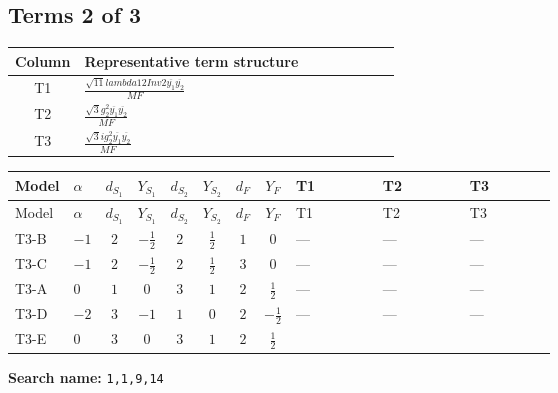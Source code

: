 \documentclass[8pt]{article}
\begin{document}
\begin{landscape}
\subsection*{Terms 2 of 3}
\begin{center}
\begin{tabular}{@{}c >{\raggedright\arraybackslash}p{0.82\linewidth}@{}}
\toprule
Column & Representative term structure \\
\midrule
T1 & \(\displaystyle \frac{\sqrt{11} lambda12Inv2 \overline{y_{1}} \overline{y_{2}}}{MF}\) \\
\midrule
T2 & \(\displaystyle \frac{\sqrt{3} g_{2}^{2} \overline{y_{1}} \overline{y_{2}}}{MF}\) \\
\midrule
T3 & \(\displaystyle \frac{\sqrt{3} i g_{2}^{2} \overline{y_{1}} \overline{y_{2}}}{MF}\) \\
\midrule
\bottomrule
\end{tabular}
\end{center}
\smallskip
\tiny
\begin{longtable}{@{}llcccccc >{\raggedright\arraybackslash}p{0.21\linewidth} >{\raggedright\arraybackslash}p{0.21\linewidth} >{\raggedright\arraybackslash}p{0.21\linewidth}@{}}
\toprule
Model & $\alpha$ & $d_{S_1}$ & $Y_{S_1}$ & $d_{S_2}$ & $Y_{S_2}$ & $d_F$ & $Y_F$ & T1 & T2 & T3 \\
\midrule
\endfirsthead
\toprule
Model & $\alpha$ & $d_{S_1}$ & $Y_{S_1}$ & $d_{S_2}$ & $Y_{S_2}$ & $d_F$ & $Y_F$ & T1 & T2 & T3 \\
\midrule
\endhead
T3-B & $-1$ & $2$ & $-\frac{1}{2}$ & $2$ & $\frac{1}{2}$ & $1$ & $0$ & --- & --- & --- \\
\midrule
T3-C & $-1$ & $2$ & $-\frac{1}{2}$ & $2$ & $\frac{1}{2}$ & $3$ & $0$ & --- & --- & --- \\
\midrule
T3-A & $0$ & $1$ & $0$ & $3$ & $1$ & $2$ & $\frac{1}{2}$ & --- & --- & --- \\
\midrule
T3-D & $-2$ & $3$ & $-1$ & $1$ & $0$ & $2$ & $-\frac{1}{2}$ & --- & --- & --- \\
\midrule
T3-E & $0$ & $3$ & $0$ & $3$ & $1$ & $2$ & $\frac{1}{2}$ & \scriptsize\adjustbox{max width=\linewidth}{$\begin{gathered} \frac{3 \sqrt{11} lambda12Inv2 \overline{y_{1}} \overline{y_{2}}}{22 MF}\end{gathered}$} & \scriptsize\adjustbox{max width=\linewidth}{$\begin{gathered} \frac{49 \sqrt{3} g_{2}^{2} \overline{y_{1}} \overline{y_{2}}}{24 MF}\end{gathered}$} & \scriptsize\adjustbox{max width=\linewidth}{$\begin{gathered} - \frac{\sqrt{3} i g_{2}^{2} \overline{y_{1}} \overline{y_{2}}}{6 MF}\end{gathered}$} \\
\midrule
\bottomrule
\end{longtable}
\clearpage
\noindent\textbf{Search name: }\texttt{1,1,9,14}\par\smallskip

\end{landscape}
\end{document}
